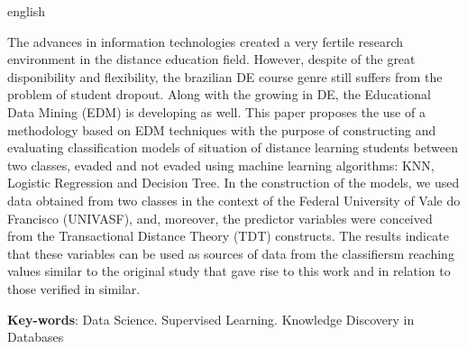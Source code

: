 \begin{resumo}[Abstract]
\begin{otherlanguage*}{english}

  The advances in information technologies created a very fertile research
  environment in the distance education field. However, despite of the great
  disponibility and flexibility, the brazilian DE course genre still suffers
  from the problem of student dropout. Along with the growing in DE, the
  Educational Data Mining (EDM) is developing as well. This paper proposes the
  use of a methodology based on EDM techniques with the purpose of constructing
  and evaluating classification models of situation of distance learning
  students between two classes, evaded and not evaded using machine learning
  algorithms: KNN, Logistic Regression and Decision Tree. In the construction of
  the models, we used data obtained from two classes in the context of the
  Federal University of Vale do Francisco (UNIVASF), and, moreover, the
  predictor variables were conceived from the Transactional Distance Theory
  (TDT) constructs. The results indicate that these variables can be used as
  sources of data from the classifiersm reaching values similar to the
  original study that gave rise to this work and in relation to those verified
  in similar.

  \textbf{Key-words}: Data Science. Supervised Learning. Knowledge Discovery in Databases

\end{otherlanguage*}
\end{resumo}


